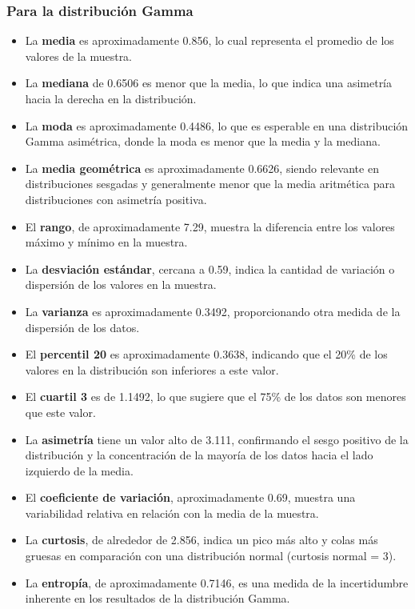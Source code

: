 \documentclass[11pt]{article} %
\begin{document}
	
	\subsubsection{Para la distribución Gamma}
	
	\begin{itemize}
		\item La \textbf{media} es aproximadamente 0.856, lo cual representa el promedio de los valores de la muestra.
		
		\item La \textbf{mediana} de 0.6506 es menor que la media, lo que indica una asimetría hacia la derecha en la distribución.
		
		\item La \textbf{moda} es aproximadamente 0.4486, lo que es esperable en una distribución Gamma asimétrica, donde la moda es menor que la media y la mediana.
		
		\item La \textbf{media geométrica} es aproximadamente 0.6626, siendo relevante en distribuciones sesgadas y generalmente menor que la media aritmética para distribuciones con asimetría positiva.
		
		\item El \textbf{rango}, de aproximadamente 7.29, muestra la diferencia entre los valores máximo y mínimo en la muestra.
		
		\item La \textbf{desviación estándar}, cercana a 0.59, indica la cantidad de variación o dispersión de los valores en la muestra.
		
		\item La \textbf{varianza} es aproximadamente 0.3492, proporcionando otra medida de la dispersión de los datos.
		
		\item El \textbf{percentil 20} es aproximadamente 0.3638, indicando que el 20\% de los valores en la distribución son inferiores a este valor.
		
		\item El \textbf{cuartil 3} es de 1.1492, lo que sugiere que el 75\% de los datos son menores que este valor.
		
		\item La \textbf{asimetría} tiene un valor alto de 3.111, confirmando el sesgo positivo de la distribución y la concentración de la mayoría de los datos hacia el lado izquierdo de la media.
		
		\item El \textbf{coeficiente de variación}, aproximadamente 0.69, muestra una variabilidad relativa en relación con la media de la muestra.
		
		\item La \textbf{curtosis}, de alrededor de 2.856, indica un pico más alto y colas más gruesas en comparación con una distribución normal (curtosis normal = 3).
		
		\item La \textbf{entropía}, de aproximadamente 0.7146, es una medida de la incertidumbre inherente en los resultados de la distribución Gamma.
	\end{itemize}
	
\end{document}
